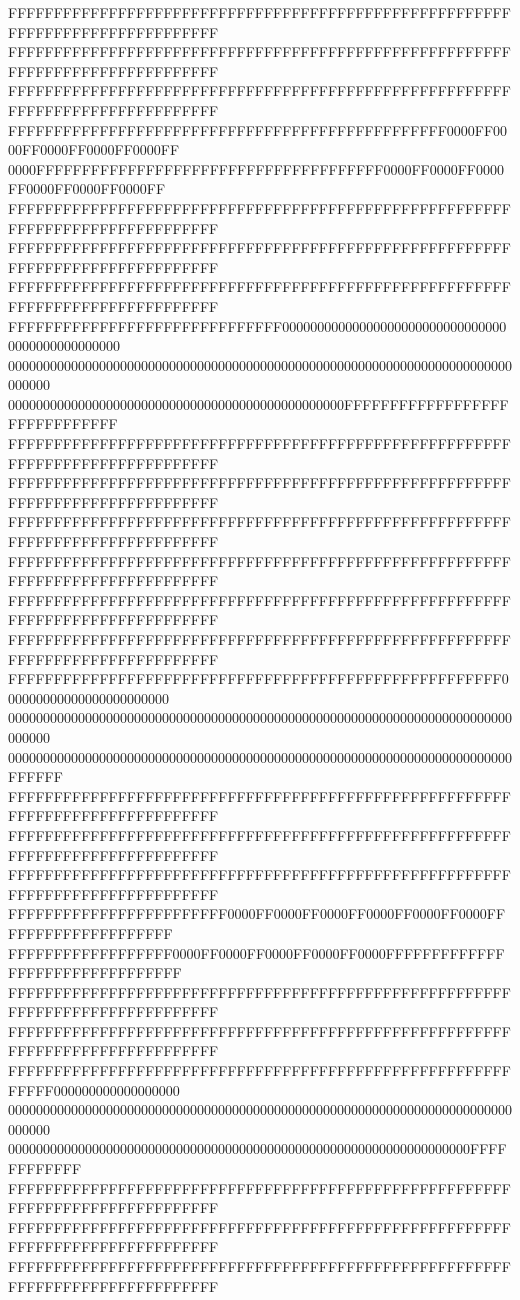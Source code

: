 FFFFFFFFFFFFFFFFFFFFFFFFFFFFFFFFFFFFFFFFFFFFFFFFFFFFFFFFFFFFFFFFFFFFFFFFFFFFFF
FFFFFFFFFFFFFFFFFFFFFFFFFFFFFFFFFFFFFFFFFFFFFFFFFFFFFFFFFFFFFFFFFFFFFFFFFFFFFF
FFFFFFFFFFFFFFFFFFFFFFFFFFFFFFFFFFFFFFFFFFFFFFFFFFFFFFFFFFFFFFFFFFFFFFFFFFFFFF
FFFFFFFFFFFFFFFFFFFFFFFFFFFFFFFFFFFFFFFFFFFFFFFF0000FF0000FF0000FF0000FF0000FF
0000FFFFFFFFFFFFFFFFFFFFFFFFFFFFFFFFFFFFFF0000FF0000FF0000FF0000FF0000FF0000FF
FFFFFFFFFFFFFFFFFFFFFFFFFFFFFFFFFFFFFFFFFFFFFFFFFFFFFFFFFFFFFFFFFFFFFFFFFFFFFF
FFFFFFFFFFFFFFFFFFFFFFFFFFFFFFFFFFFFFFFFFFFFFFFFFFFFFFFFFFFFFFFFFFFFFFFFFFFFFF
FFFFFFFFFFFFFFFFFFFFFFFFFFFFFFFFFFFFFFFFFFFFFFFFFFFFFFFFFFFFFFFFFFFFFFFFFFFFFF
FFFFFFFFFFFFFFFFFFFFFFFFFFFFFF000000000000000000000000000000000000000000000000
000000000000000000000000000000000000000000000000000000000000000000000000000000
000000000000000000000000000000000000000000000000FFFFFFFFFFFFFFFFFFFFFFFFFFFFFF
FFFFFFFFFFFFFFFFFFFFFFFFFFFFFFFFFFFFFFFFFFFFFFFFFFFFFFFFFFFFFFFFFFFFFFFFFFFFFF
FFFFFFFFFFFFFFFFFFFFFFFFFFFFFFFFFFFFFFFFFFFFFFFFFFFFFFFFFFFFFFFFFFFFFFFFFFFFFF
FFFFFFFFFFFFFFFFFFFFFFFFFFFFFFFFFFFFFFFFFFFFFFFFFFFFFFFFFFFFFFFFFFFFFFFFFFFFFF
FFFFFFFFFFFFFFFFFFFFFFFFFFFFFFFFFFFFFFFFFFFFFFFFFFFFFFFFFFFFFFFFFFFFFFFFFFFFFF
FFFFFFFFFFFFFFFFFFFFFFFFFFFFFFFFFFFFFFFFFFFFFFFFFFFFFFFFFFFFFFFFFFFFFFFFFFFFFF
FFFFFFFFFFFFFFFFFFFFFFFFFFFFFFFFFFFFFFFFFFFFFFFFFFFFFFFFFFFFFFFFFFFFFFFFFFFFFF
FFFFFFFFFFFFFFFFFFFFFFFFFFFFFFFFFFFFFFFFFFFFFFFFFFFFFF000000000000000000000000
000000000000000000000000000000000000000000000000000000000000000000000000000000
000000000000000000000000000000000000000000000000000000000000000000000000FFFFFF
FFFFFFFFFFFFFFFFFFFFFFFFFFFFFFFFFFFFFFFFFFFFFFFFFFFFFFFFFFFFFFFFFFFFFFFFFFFFFF
FFFFFFFFFFFFFFFFFFFFFFFFFFFFFFFFFFFFFFFFFFFFFFFFFFFFFFFFFFFFFFFFFFFFFFFFFFFFFF
FFFFFFFFFFFFFFFFFFFFFFFFFFFFFFFFFFFFFFFFFFFFFFFFFFFFFFFFFFFFFFFFFFFFFFFFFFFFFF
FFFFFFFFFFFFFFFFFFFFFFFF0000FF0000FF0000FF0000FF0000FF0000FFFFFFFFFFFFFFFFFFFF
FFFFFFFFFFFFFFFFFF0000FF0000FF0000FF0000FF0000FFFFFFFFFFFFFFFFFFFFFFFFFFFFFFFF
FFFFFFFFFFFFFFFFFFFFFFFFFFFFFFFFFFFFFFFFFFFFFFFFFFFFFFFFFFFFFFFFFFFFFFFFFFFFFF
FFFFFFFFFFFFFFFFFFFFFFFFFFFFFFFFFFFFFFFFFFFFFFFFFFFFFFFFFFFFFFFFFFFFFFFFFFFFFF
FFFFFFFFFFFFFFFFFFFFFFFFFFFFFFFFFFFFFFFFFFFFFFFFFFFFFFFFFFFF000000000000000000
000000000000000000000000000000000000000000000000000000000000000000000000000000
000000000000000000000000000000000000000000000000000000000000000000FFFFFFFFFFFF
FFFFFFFFFFFFFFFFFFFFFFFFFFFFFFFFFFFFFFFFFFFFFFFFFFFFFFFFFFFFFFFFFFFFFFFFFFFFFF
FFFFFFFFFFFFFFFFFFFFFFFFFFFFFFFFFFFFFFFFFFFFFFFFFFFFFFFFFFFFFFFFFFFFFFFFFFFFFF
FFFFFFFFFFFFFFFFFFFFFFFFFFFFFFFFFFFFFFFFFFFFFFFFFFFFFFFFFFFFFFFFFFFFFFFFFFFFFF
